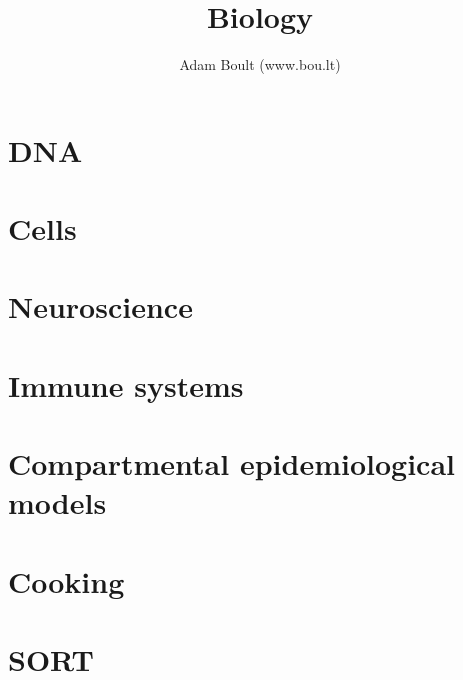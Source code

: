 \documentclass[oneside]{book}
\begin{document}
\author{Adam Boult (www.bou.lt)}
\title{Biology}
\maketitle

\setcounter{tocdepth}{0}
\tableofcontents



\part{DNA}



\part{Cells}





\part{Neuroscience}


\part{Immune systems}







\part{Compartmental epidemiological models}






\part{Cooking}








\part{SORT}

\end{document}
